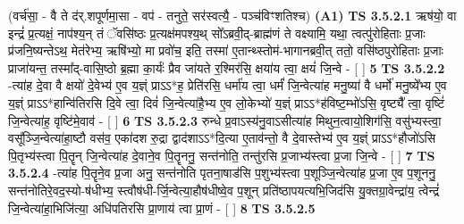 \documentclass[17pt]{extarticle}
\begin{document}
                  \newline
                      (वर्च॑सा॒ - वै ते द॑र्.शपूर्णमा॒सा - वप॑ - तनुते॒ सर॑स्वत्यै॒ - पञ्च॑विꣳशतिश्च)  \textbf{(A1)} \newline \newline
                                        \textbf{ TS 3.5.2.1} \newline
                  ऋष॑यो॒ वा इन्द्रं॑ प्र॒त्यक्षं॒ नाप॑श्य॒न् तं ॅवसि॑ष्ठः प्र॒त्यक्ष॑मपश्य॒थ् सो᳚ऽब्रवी॒द्-ब्राह्म॑णं ते वक्ष्यामि॒ यथा॒ त्वत्पु॑रोहिताः प्र॒जाः प्र॑जनि॒ष्यन्तेऽथ॒ मेत॑रेभ्य॒ ऋषि॑भ्यो॒ मा प्रवो॑च॒ इति॒ तस्मा॑ ए॒तान्थ्स्तोम॑-भागानब्रवी॒त् ततो॒ वसि॑ष्ठपुरोहिताः प्र॒जाः प्राजा॑यन्त॒ तस्मा᳚द्-वासि॒ष्ठो ब्र॒ह्मा का॒र्यः॑ प्रैव जा॑यते र॒श्मिर॑सि॒ क्षया॑य त्वा॒ क्षयं॑ जि॒न्वे - [  ] \textbf{  5} \newline
                  \newline
                                \textbf{ TS 3.5.2.2} \newline
                  -त्या॑ह दे॒वा वै क्षयो॑ दे॒वेभ्य॑ ए॒व य॒ज्ञ्ं प्राऽऽ*ह॒ प्रेति॑रसि॒ धर्मा॑य त्वा॒ धर्मं॑ जि॒न्वेत्या॑ह मनु॒ष्या॑ वै धर्मो॑ मनु॒ष्ये᳚भ्य ए॒व य॒ज्ञ्ं प्राऽऽ*हान्वि॑तिरसि दि॒वे त्वा॒ दिवं॑ जि॒न्वेत्या॑है॒भ्य ए॒व लो॒केभ्यो॑ य॒ज्ञ्ं प्राऽऽ*ह॑विष्ट॒म्भो॑ऽसि॒ वृष्ट्यै᳚ त्वा॒ वृष्टिं॑ जि॒न्वेत्या॑ह॒ वृष्टि॑मे॒वाव॑ - [  ] \textbf{  6} \newline
                  \newline
                                \textbf{ TS 3.5.2.3} \newline
                  रुन्धे प्र॒वाऽस्य॑नु॒वाऽसीत्या॑ह मिथुन॒त्वायो॒शिग॑सि॒ वसु॑भ्यस्त्वा॒ वसू᳚ञ्जि॒न्वेत्या॑हा॒ष्टौ वस॑व॒ एका॑दश रु॒द्रा द्वाद॑शाऽऽ*दि॒त्या ए॒ताव॑न्तो॒ वै दे॒वास्तेभ्य॑ ए॒व य॒ज्ञ्ं प्राऽऽ*हौजो॑ऽसि पि॒तृभ्य॑स्त्वा पि॒तॄन् जि॒न्वेत्या॑ह दे॒वाने॒व पि॒तॄननु॒ सन्त॑नोति॒ तन्तु॑रसि प्र॒जाभ्य॑स्त्वा प्र॒जा जि॒न्वे - [  ] \textbf{  7} \newline
                  \newline
                                \textbf{ TS 3.5.2.4} \newline
                  -त्या॑ह पि॒तॄने॒व प्र॒जा अनु॒ सन्त॑नोति पृतना॒षाड॑सि प॒शुभ्य॑स्त्वा प॒शूञ्जि॒न्वेत्या॑ह प्र॒जा ए॒व प॒शूननु॒ सन्त॑नोतिरे॒वद॒स्यो-ष॑धीभ्य॒ स्त्वौष॑धी-र्जि॒न्वेत्या॒हौष॑धीष्वे॒व प॒शून् प्रति॑ष्ठापयत्यभि॒जिद॑सि यु॒क्तग्रा॒वेन्द्रा॑य॒ त्वेन्द्रं॑ जि॒न्वेत्या॑हा॒भिजि॑त्या॒ अधि॑पतिरसि प्रा॒णाय॑ त्वा प्रा॒णं - [  ] \textbf{  8} \newline
                  \newline
                                \textbf{ TS 3.5.2.5} \newline
\end{document}
